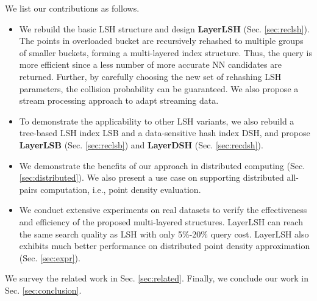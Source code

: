  We list our contributions as follows.
\begin{itemize}[leftmargin=*]
\item We rebuild the basic LSH structure and design \textbf{LayerLSH} (Sec. \ref{sec:reclsh}). The points in overloaded bucket are recursively rehashed to multiple groups of smaller buckets, forming a multi-layered index structure. Thus, the query is more efficient since a less number of more accurate NN candidates are returned. Further, by carefully choosing the new set of rehashing LSH parameters, the collision probability can be guaranteed. We also propose a stream processing approach to adapt streaming data.
\item To demonstrate the applicability to other LSH variants, we also rebuild a tree-based LSH index LSB and a data-sensitive hash index DSH, and propose \textbf{LayerLSB} (Sec. \ref{sec:reclsb}) and \textbf{LayerDSH} (Sec. \ref{sec:recdsh}).
\item We demonstrate the benefits of our approach in distributed computing (Sec. \ref{sec:distributed}). We also present a use case on supporting distributed all-pairs computation, i.e., point density evaluation.
\item We conduct extensive experiments on real datasets to verify the effectiveness and efficiency of the proposed multi-layered structures. LayerLSH can reach the same search quality as LSH with only 5\%-20\% query cost. LayerLSH also exhibits much better performance on distributed point density approximation (Sec. \ref{sec:expr}).
\end{itemize}

We survey the related work in Sec. \ref{sec:related}. Finally, we conclude our work in Sec. \ref{sec:conclusion}.

